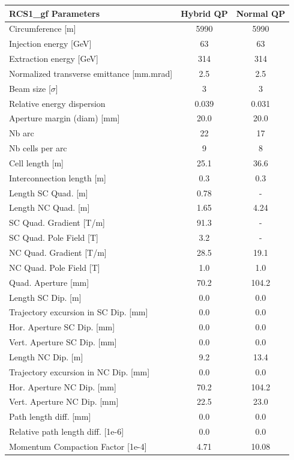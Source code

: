 \begin{tabular}{lcc}
\toprule
RCS1_gf Parameters & Hybrid QP & Normal QP \\
\midrule
Circumference [m] & 5990 & 5990 \\
Injection energy [GeV] & 63 & 63 \\
Extraction energy [GeV] & 314 & 314 \\
Normalized transverse emittance [mm.mrad] & 2.5 & 2.5 \\
Beam size [$\sigma$] & 3 & 3 \\
Relative energy dispersion & 0.039 & 0.031 \\
Aperture margin (diam) [mm] & 20.0 & 20.0 \\
Nb arc & 22 & 17 \\
Nb cells per arc & 9 & 8 \\
Cell length [m] & 25.1 & 36.6 \\
Interconnection length [m] & 0.3 & 0.3 \\
Length SC Quad. [m] & 0.78 & - \\
Length NC Quad. [m] & 1.65 & 4.24 \\
SC Quad. Gradient [T/m] & 91.3 & - \\
SC Quad. Pole Field [T] & 3.2 & - \\
NC Quad. Gradient [T/m] & 28.5 & 19.1 \\
NC Quad. Pole Field [T] & 1.0 & 1.0 \\
Quad. Aperture [mm] & 70.2 & 104.2 \\
Length SC Dip. [m] & 0.0 & 0.0 \\
Trajectory excursion in SC Dip. [mm] & 0.0 & 0.0 \\
Hor. Aperture SC Dip. [mm] & 0.0 & 0.0 \\
Vert. Aperture SC Dip. [mm] & 0.0 & 0.0 \\
Length NC Dip. [m] & 9.2 & 13.4 \\
Trajectory excursion in NC Dip. [mm] & 0.0 & 0.0 \\
Hor. Aperture NC Dip. [mm] & 70.2 & 104.2 \\
Vert. Aperture NC Dip. [mm] & 22.5 & 23.0 \\
Path length diff. [mm] & 0.0 & 0.0 \\
Relative path length diff. [1e-6] & 0.0 & 0.0 \\
Momentum Compaction Factor [1e-4] & 4.71 & 10.08 \\
\bottomrule
\end{tabular}
